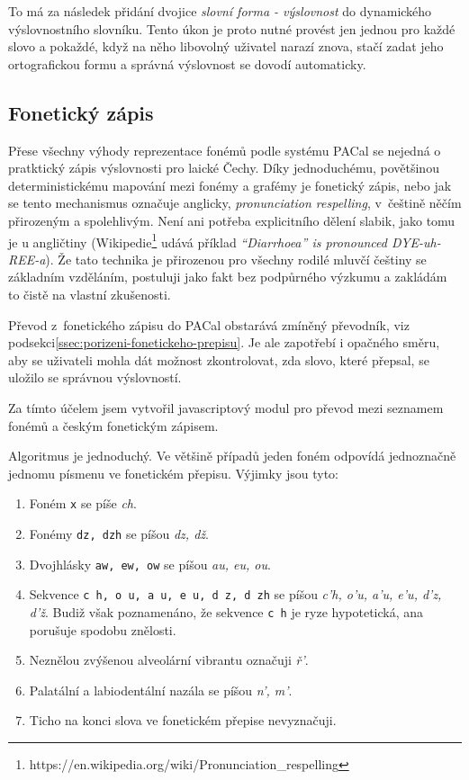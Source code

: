 To má za následek přidání dvojice {\em slovní forma - výslovnost} do dynamického
výslovnostního slovníku. Tento úkon je proto nutné provést jen jednou pro každé
slovo a pokaždé, když na něho libovolný uživatel narazí znova, stačí zadat jeho
ortografickou formu a správná výslovnost se dovodí automaticky.

\subsection{Fonetický zápis}

Přese všechny výhody reprezentace fonémů podle systému PACal se nejedná o
pratktický zápis výslovnosti pro laické Čechy. Díky jednoduchému, povětšinou
deterministickému mapování mezi fonémy a grafémy je fonetický zápis, nebo jak
se tento mechanismus označuje anglicky, {\em pronunciation respelling},
v~češtině něčím přirozeným a spolehlivým. Není ani potřeba explicitního dělení
slabik, jako tomu je u angličtiny
(Wikipedie\footnote{https://en.wikipedia.org/wiki/Pronunciation\_respelling}
udává příklad {\em ``Diarrhoea'' is pronounced DYE-uh-REE-a}).
Že tato technika je přirozenou pro všechny rodilé mluvčí češtiny se základním vzděláním,
postuluji jako fakt bez podpůrného výzkumu a zakládám to čistě na vlastní
zkušenosti.

Převod z~fonetického zápisu do PACal obstarává zmíněný převodník, viz
podsekci\ref{ssec:porizeni-fonetickeho-prepisu}. Je ale zapotřebí i opačného
směru, aby se uživateli mohla dát možnost zkontrolovat, zda slovo, které
přepsal, se uložilo se správnou výslovností.

Za tímto účelem jsem vytvořil javascriptový modul pro převod mezi seznamem
fonémů a českým fonetickým zápisem.

Algoritmus je jednoduchý. Ve většině případů jeden foném odpovídá jednoznačně
jednomu písmenu ve fonetickém přepisu. Výjimky jsou tyto:
\begin{enumerate}
\item{Foném \texttt{x} se píše {\em ch}.}
\item{Fonémy \texttt{dz, dzh} se píšou {\em dz, dž}.}
\item{Dvojhlásky \texttt{aw, ew, ow} se píšou {\em au, eu, ou}.}
\item{
    Sekvence \texttt{c h, o u, a u, e u, d z, d zh} se píšou
    {\em c'h, o'u, a'u, e'u, d'z, d'ž}.
    Budiž však poznamenáno, že sekvence \texttt{c h} je ryze hypotetická, ana
    porušuje spodobu znělosti.
}
\item{
    Neznělou zvýšenou alveolární vibrantu označuji {\em ř'}.
}
\item{
    Palatální a labiodentální nazála se píšou {\em n', m'}.
}
\item{Ticho na konci slova ve fonetickém přepise nevyznačuji.}
\end{enumerate}


